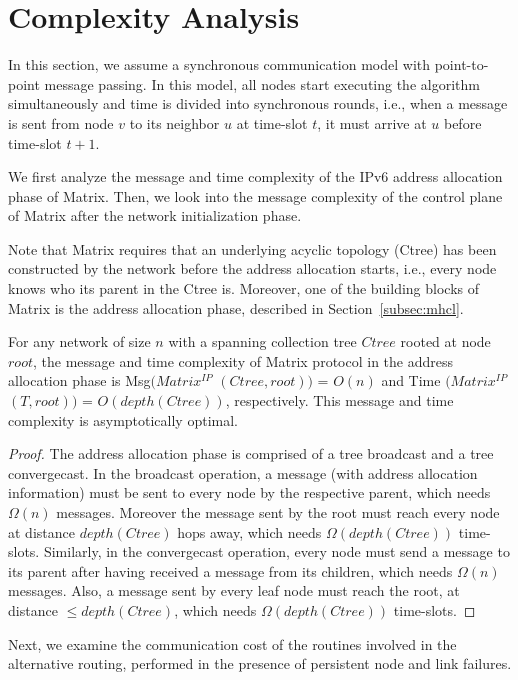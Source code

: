 \section{Complexity Analysis}\label{sec:analysis}

In this section, we assume a synchronous communication model with
point-to-point message passing. In this model, all nodes start
executing the algorithm simultaneously and time is divided into
synchronous rounds, i.e., when a message is sent from node $v$ to
its neighbor $u$ at time-slot $t$, it must arrive at $u$ before
time-slot $t+1$.

We first analyze the message and time complexity of the IPv6 address
allocation phase of Matrix. Then, we look into the message
complexity of the control plane of Matrix after the network
initialization phase.

Note that Matrix requires that an underlying acyclic topology (Ctree) has
been constructed by the network before the address allocation starts, i.e.,
every node knows who its parent in the Ctree is.
Moreover, one of the building blocks of Matrix is the address allocation phase, described in Section~\ref{subsec:mhcl}.

\begin{theorem} For any network of size $n$ with a
spanning collection tree $Ctree$ rooted at node $root$, the message and time
complexity of Matrix protocol in the address allocation phase is
Msg$(Matrix^{IP}$ $(Ctree, root))$ = $O(n)$ and Time $(Matrix^{IP}$ $(T, root))$
= $O(depth(Ctree))$, respectively. This message and time complexity is
asymptotically optimal.
\end{theorem}
\begin{proof}
The address allocation phase is comprised of a tree broadcast and a tree
convergecast.
In the broadcast operation, a message (with address allocation information) must be
sent to every node by the respective parent, which needs $\Omega(n)$ messages.
Moreover the message sent by the root must reach every node at distance
$depth(Ctree)$ hops away, which needs $\Omega(depth(Ctree))$ time-slots.
Similarly, in the convergecast operation, every node must send a message to its
parent after having received a message from its children, which needs
$\Omega(n)$ messages. Also, a message sent by every leaf node must reach the
root, at distance $\leq depth(Ctree)$, which needs $\Omega(depth(Ctree))$
time-slots.
\end{proof}

Next, we examine the communication cost of the routines involved in
the alternative routing, performed in the presence of persistent
node and link failures.

